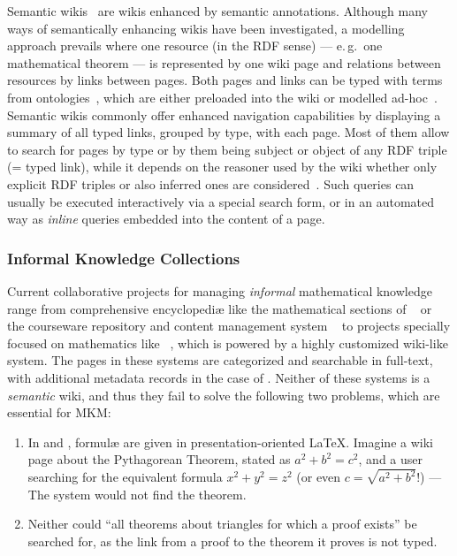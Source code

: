 \documentclass{llncs}
\begin{document}
Semantic wikis~\cite{semwiki06} are wikis enhanced by semantic annotations.  Although many
ways of semantically enhancing wikis have been investigated, a modelling approach prevails
where one resource (in the RDF sense) --- e.\,g.\ one mathematical theorem --- is
represented by one wiki page and relations between resources by links between pages.  Both
pages and links can be typed with terms from
ontologies~\cite{OrDeMoVoHa06:annotation-navigation-semwiki}, which are either preloaded
into the wiki or modelled ad-hoc~\cite{KrSchVr:semwiki-reasoning07}.  Semantic wikis
commonly offer enhanced navigation capabilities by displaying a summary of all typed
links, grouped by type, with each page.  Most of them allow to search for pages by type or
by them being subject or object of any RDF triple (= typed link), while it depends on the
reasoner used by the wiki whether only explicit RDF triples or also inferred ones are
considered~\cite{KrSchVr:semwiki-reasoning07}.  Such queries can usually be executed
interactively via a special search form, or in an automated way as \emph{inline} queries
embedded into the content of a page.

\subsubsection{Informal Knowledge Collections}
\label{sec:math-knowledge-collections}

Current collaborative projects for managing \emph{informal} mathematical knowledge range
from comprehensive encyclopediæ like the mathematical sections of
~\cite{wikipedia} or the courseware repository and content management
system ~\cite{CNX:whitepaper} to projects specially focused on
mathematics like ~\cite{krowne03:collaborative-math-libraries}, which
is powered by a highly customized wiki-like system.  The pages in these systems are
categorized and searchable in full-text, with additional metadata records in the case of
.  Neither of these systems is a \emph{semantic} wiki, and thus they
fail to solve the following two problems, which are essential for MKM:

\begin{enumerate}
\item\label{item:formula-search-usecase} In  and ,
  formulæ are given in presentation-oriented {\LaTeX}.  Imagine a wiki page about the
  Pythagorean Theorem, stated as $a^2 + b^2 = c^2$, and a user searching for the
  equivalent formula $x^2 + y^2 = z^2$ (or even $c=\sqrt{a^2+b^2}$!) --- The system would
  not find the theorem.
\item Neither could ``all theorems about triangles for which a
  proof exists'' be searched for, as the link from a proof to the theorem it proves is not
  typed.
\end{enumerate}
\end{document}
